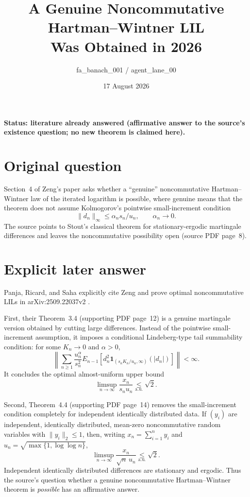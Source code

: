 \documentclass[10pt]{article}
\title{A Genuine Noncommutative Hartman--Wintner LIL\\
Was Obtained in 2026}
\author{fa\_banach\_001 / agent\_lane\_00}
\date{17 August 2026}
\begin{document}
\maketitle
\vspace{-1.2em}
\small

\noindent\textbf{Status: literature already answered (affirmative answer
to the source's existence question; no new theorem is claimed here).}

\section*{Original question}

Section~4 of Zeng's paper asks whether a ``genuine'' noncommutative
Hartman--Wintner law of the iterated logarithm is possible, where genuine
means that the theorem does not assume Kolmogorov's pointwise small-increment
condition
\[
                   \|d_n\|_\infty\leq \alpha_n s_n/u_n,
                   \qquad \alpha_n\longrightarrow0.
\]
The source points to Stout's classical theorem for stationary-ergodic
martingale differences and leaves the noncommutative possibility open
\cite{Zeng} (source PDF page~8).

\section*{Explicit later answer}

Panja, Ricard, and Saha explicitly cite Zeng and prove optimal
noncommutative LILs in arXiv:2509.22037v2 \cite{PRS}.

First, their Theorem~3.4 (supporting PDF page~12) is a genuine martingale
version obtained by cutting large differences.  Instead of the pointwise
small-increment assumption, it imposes a conditional Lindeberg-type tail
summability condition: for some $K_n\to0$ and $\alpha>0$,
\[
 \left\|\sum_{n\geq1}\frac{u_n^\alpha}{s_n^2}
 E_{n-1}\!\left[d_n^2
 \mathbf 1_{(s_nK_n/u_n,\infty)}(|d_n|)\right]\right\|<\infty.
\]
It concludes the optimal almost-uniform upper bound
\[
          \limsup_{n\to\infty}\frac{x_n}{s_nu_n}
          \underset{\mathrm{a.u.}}{\leq}\sqrt2.
\]

Second, Theorem~4.4 (supporting PDF page~14) removes the small-increment
condition completely for independent identically distributed data.  If
$(y_i)$ are independent, identically distributed, mean-zero
noncommutative random variables with $\|y_i\|_2\leq1$, then, writing
$x_n=\sum_{i=1}^n y_i$ and $u_n=\sqrt{\max\{1,\log\log n\}}$,
\[
          \limsup_{n\to\infty}\frac{x_n}{\sqrt n\,u_n}
          \underset{\mathrm{a.u.}}{\leq}\sqrt2.
\]
Independent identically distributed differences are stationary and
ergodic.  Thus the source's question whether a genuine noncommutative
Hartman--Wintner theorem is \emph{possible} has an affirmative answer.
\end{document}
